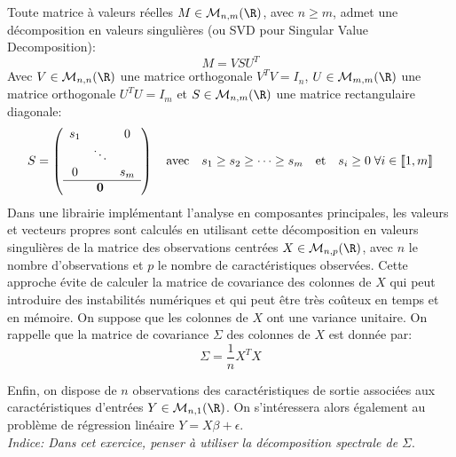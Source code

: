 \documentclass[solutions]{../exercices}
\begin{document}
	\begin{exercice}
		Toute matrice à valeurs réelles $M \in \mathcal{M}_{n,m}(\R)$, avec $n \ge m$, admet une décomposition en valeurs singulières (ou SVD pour Singular Value Decomposition):
		\begin{equation*}
			M = V S U^T
		\end{equation*}
		Avec $V \in \mathcal{M}_{n,n}(\R)$ une matrice orthogonale $V^T V = I_n$, $U \in \mathcal{M}_{m,m}(\R)$ une matrice orthogonale $U^T U = I_m$ et $S \in \mathcal{M}_{n,m}(\R)$ une matrice rectangulaire diagonale:
		\begin{equation*}
			S = 
			\left(
			\begin{array}{ccc}
				s_1 &        & 0 \\
				& \ddots &   \\
				0        &        & s_m \\
				\hline
				& \mathbf{0} & 
			\end{array}
			\right)	\quad \text{avec} \quad s_1 \ge s_2 \ge \cdots \ge s_m \quad \text{et} \quad s_i \ge 0 \; \forall i \in \llbracket1, m\rrbracket
		\end{equation*}		
		Dans une librairie implémentant l'analyse en composantes principales, les valeurs et vecteurs propres sont calculés en utilisant cette décomposition en valeurs singulières de la matrice des observations centrées $X \in \mathcal{M}_{n,p}(\R)$, avec $n$ le nombre d'observations et $p$ le nombre de caractéristiques observées. Cette approche évite de calculer la matrice de covariance des colonnes de $X$ qui peut introduire des instabilités numériques et qui peut être très coûteux en temps et en mémoire. On suppose que les colonnes de $X$ ont une variance unitaire.
		On rappelle que la matrice de covariance $\Sigma$ des colonnes de $X$ est donnée par:
		\begin{equation*}
			\Sigma = \frac{1}{n} X^T X
		\end{equation*}

		Enfin, on dispose de $n$ observations des caractéristiques de sortie associées aux caractéristiques d'entrées $Y \in \mathcal{M}_{n,1}(\R)$. On s'intéressera alors également au problème de régression linéaire $Y = X \beta + \epsilon$. \\

		\noindent \textit{Indice: Dans cet exercice, penser à utiliser la décomposition spectrale de $\Sigma$}.


\end{exercice}
\end{document}
